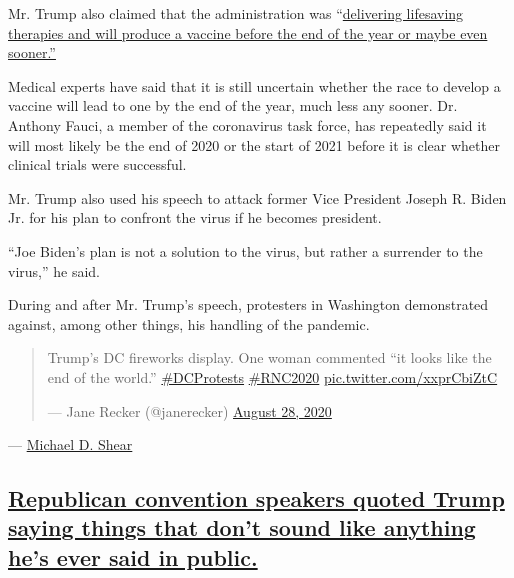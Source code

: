 Mr. Trump also claimed that the administration was
``\href{https://www.nytimes3xbfgragh.onion/live/2020/08/27/us/rnc-fact-check?action=click\&module=Spotlight\&pgtype=Homepage\#we-are-delivering-lifesaving-therapies-and-will-produce-a-vaccine-before-the-end-of-the-year-or-maybe-even-sooner}{delivering
lifesaving therapies and will produce a vaccine before the end of the
year or maybe even sooner.''}

Medical experts have said that it is still uncertain whether the race to
develop a vaccine will lead to one by the end of the year, much less any
sooner. Dr. Anthony Fauci, a member of the coronavirus task force, has
repeatedly said it will most likely be the end of 2020 or the start of
2021 before it is clear whether clinical trials were successful.

Mr. Trump also used his speech to attack former Vice President Joseph R.
Biden Jr. for his plan to confront the virus if he becomes president.

``Joe Biden's plan is not a solution to the virus, but rather a
surrender to the virus,'' he said.

During and after Mr. Trump's speech, protesters in Washington
demonstrated against, among other things, his handling of the pandemic.

\begin{quote}
Trump's DC fireworks display. One woman commented ``it looks like the
end of the world.''
\href{https://twitter.com/hashtag/DCProtests?src=hash\&ref_src=twsrc\%5Etfw}{\#DCProtests}
\href{https://twitter.com/hashtag/RNC2020?src=hash\&ref_src=twsrc\%5Etfw}{\#RNC2020}
\href{https://t.co/xxprCbiZtC}{pic.twitter.com/xxprCbiZtC}

--- Jane Recker (@janerecker)
\href{https://twitter.com/janerecker/status/1299191736741306369?ref_src=twsrc\%5Etfw}{August
28, 2020}
\end{quote}

--- \href{https://www.nytimes3xbfgragh.onion/by/michael-d-shear}{Michael
D. Shear}

\hypertarget{republican-convention-speakers-quoted-trump-saying-things-that-dont-sound-like-anything-hes-ever-said-in-public}{%
\subsection{\texorpdfstring{\protect\hyperlink{republican-convention-speakers-quoted-trump-saying-things-that-dont-sound-like-anything-hes-ever-said-in-public}{Republican
convention speakers quoted Trump saying things that don't sound like
anything he's ever said in
public.}}{Republican convention speakers quoted Trump saying things that don't sound like anything he's ever said in public.}}\label{republican-convention-speakers-quoted-trump-saying-things-that-dont-sound-like-anything-hes-ever-said-in-public}}

